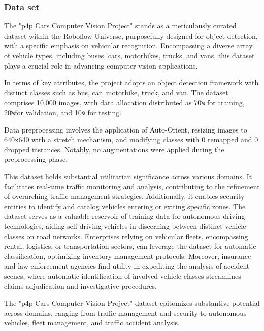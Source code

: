 \subsubsection{Data set}
The "p4p Cars Computer Vision Project" stands as a meticulously curated dataset within the Roboflow Universe, purposefully designed for object detection, with a specific emphasis on vehicular recognition. Encompassing a diverse array of vehicle types, including buses, cars, motorbikes, trucks, and vans, this dataset plays a crucial role in advancing computer vision applications.

In terms of key attributes, the project adopts an object detection framework with distinct classes such as bus, car, motorbike, truck, and van. The dataset comprises 10,000 images, with data allocation distributed as 70\texttt{\%} for training, 20\texttt{\%}for validation, and 10\texttt{\%} for testing.

Data preprocessing involves the application of Auto-Orient, resizing images to 640x640 with a stretch mechanism, and modifying classes with 0 remapped and 0 dropped instances. Notably, no augmentations were applied during the preprocessing phase.

This dataset holds substantial utilitarian significance across various domains. It facilitates real-time traffic monitoring and analysis, contributing to the refinement of overarching traffic management strategies. Additionally, it enables security entities to identify and catalog vehicles entering or exiting specific zones. The dataset serves as a valuable reservoir of training data for autonomous driving technologies, aiding self-driving vehicles in discerning between distinct vehicle classes on road networks. Enterprises relying on vehicular fleets, encompassing rental, logistics, or transportation sectors, can leverage the dataset for automatic classification, optimizing inventory management protocols. Moreover, insurance and law enforcement agencies find utility in expediting the analysis of accident scenes, where automatic identification of involved vehicle classes streamlines claims adjudication and investigative procedures.

The "p4p Cars Computer Vision Project" dataset epitomizes substantive potential across domains, ranging from traffic management and security to autonomous vehicles, fleet management, and traffic accident analysis.\cite{p4p-cars_dataset}

